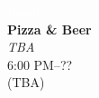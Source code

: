 \begin{calendar}{\textwidth}
{\textcolor{white}{Break}\vspace{.6cm}\\\daysep
\textbf{Pizza \& Beer} \\ \textit{TBA} \\\vspace{0.1cm} 6:00 PM--?? \\ (TBA) \\\daysep
}



\end{calendar}
